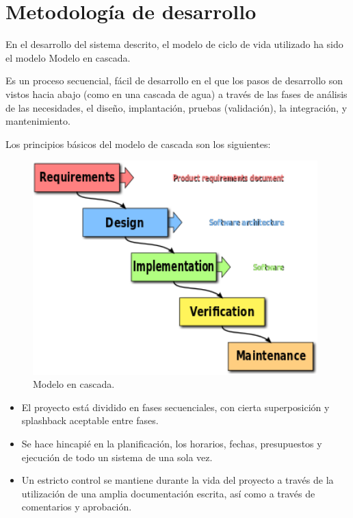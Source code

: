 \section{Metodología de desarrollo}
\label{sec:metodologiadedesarrollo}

En el desarrollo del sistema descrito, el modelo de ciclo de vida utilizado ha sido el modelo Modelo en cascada.

Es un proceso secuencial, fácil de desarrollo en el que los pasos de desarrollo son vistos hacia abajo (como en una cascada de agua) a través de las fases de análisis de las necesidades, el diseño, implantación, pruebas (validación), la integración, y mantenimiento. 

Los principios básicos del modelo de cascada son los siguientes:
\begin{figure} [hbtp]
  \begin{center}
    \includegraphics[width=11cm]{img/cap2/Waterfall_model}
  \end{center}
  \caption{Modelo en cascada.}
  \label{fig:Waterfall_model}
\end{figure}

\begin{itemize}
\item El proyecto está dividido en fases secuenciales, con cierta superposición y splashback aceptable entre fases.
\item Se hace hincapié en la planificación, los horarios, fechas, presupuestos y ejecución de todo un sistema de una sola vez.
\item Un estricto control se mantiene durante la vida del proyecto a través de la utilización de una amplia documentación escrita, así como a través de comentarios y aprobación.
\end{itemize}

